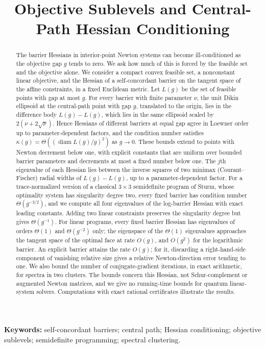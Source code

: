 \documentclass[11pt]{article}
\title{Objective Sublevels and Central-Path Hessian Conditioning}
\author{}
\date{}
\theoremstyle{definition}
\theoremstyle{remark}
\begin{document}
\maketitle
\begin{abstract}
The barrier Hessians in interior-point Newton systems can become
ill-conditioned as the objective gap $g$ tends to zero. We ask how much
of this is forced by the feasible set and the objective alone. We
consider a compact convex feasible set, a nonconstant linear objective,
and the Hessian of a self-concordant barrier on the tangent space of the
affine constraints, in a fixed Euclidean metric. Let $L(g)$ be the set
of feasible points with gap at most $g$. For every barrier with finite
parameter $\nu$, the unit Dikin ellipsoid at the central-path point
with gap $g$, translated to the origin, lies in the difference body
$L(g)-L(g)$, which lies in the same ellipsoid scaled by
$2(\nu+2\sqrt\nu)$. Hence Hessians of different barriers at equal gap
agree in Loewner order up to parameter-dependent factors, and the
condition number satisfies
$\kappa(g)=\Theta((\operatorname{diam}L(g)/g)^2)$ as $g\to0$. These
bounds extend to points with Newton decrement below one, with explicit
constants that are uniform over bounded barrier parameters and
decrements at most a fixed number below one. The $j$th eigenvalue of
each Hessian lies between the inverse squares of two minimax
(Courant--Fischer) radial widths of $L(g)-L(g)$, up to a parameter-dependent
factor. For a trace-normalized version of a classical $3\times3$ semidefinite
program of Sturm, whose optimality system has singularity
degree two, every fixed barrier has condition number
$\Theta(g^{-3/2})$, and we compute all four eigenvalues of the
log-barrier Hessian with exact leading constants. Adding two linear
constraints preserves the singularity degree but gives
$\Theta(g^{-1})$. For linear programs, every fixed barrier Hessian has
eigenvalues of orders $\Theta(1)$ and $\Theta(g^{-2})$ only; the
eigenspace of the $\Theta(1)$ eigenvalues approaches the tangent space
of the optimal face at rate $O(g)$, and $O(g^2)$ for the logarithmic
barrier. An explicit barrier attains the rate $O(g)$; for it,
discarding a right-hand-side component of vanishing relative size gives
a relative Newton-direction error tending to one. We also bound the number of
conjugate-gradient iterations, in exact arithmetic, for spectra in two
clusters. The bounds concern this Hessian, not Schur-complement or
augmented Newton matrices, and we give no running-time bounds for
quantum linear-system solvers. Computations with exact rational certificates
illustrate the results.
\end{abstract}
\noindent\textbf{Keywords:} self-concordant barriers; central path;
Hessian conditioning; objective sublevels; semidefinite programming;
spectral clustering.














\end{document}

